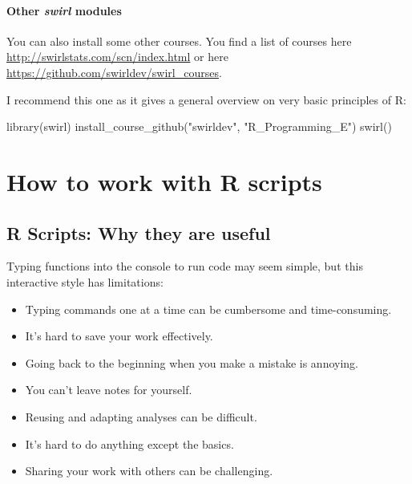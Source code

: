 \documentclass[
  12pt,
  oneside]{book}
\newenvironment{Shaded}{\begin{snugshade}}{\end{snugshade}}
\newcommand{\FunctionTok}[1]{\textcolor[rgb]{0.00,0.00,0.00}{#1}}
\newcommand{\NormalTok}[1]{#1}
\newcommand{\StringTok}[1]{\textcolor[rgb]{0.31,0.60,0.02}{#1}}
\providecommand{\tightlist}{%
  \setlength{\itemsep}{0pt}\setlength{\parskip}{0pt}}
\begin{document}
\hypertarget{other-swirl-modules}{%
\subsubsection*{\texorpdfstring{Other \emph{swirl} modules}{Other swirl modules}}\label{other-swirl-modules}}

You can also install some other courses. You find a list of courses here \url{http://swirlstats.com/scn/index.html} or here \url{https://github.com/swirldev/swirl_courses}.

I recommend this one as it gives a general overview on very basic principles of R:

\begin{Shaded}
\begin{Highlighting}[]
\FunctionTok{library}\NormalTok{(swirl)}
\FunctionTok{install\_course\_github}\NormalTok{(}\StringTok{"swirldev"}\NormalTok{, }\StringTok{"R\_Programming\_E"}\NormalTok{)}
\FunctionTok{swirl}\NormalTok{()}
\end{Highlighting}
\end{Shaded}

\hypertarget{how-to-work-with-r-scripts}{%
\chapter{How to work with R scripts}\label{how-to-work-with-r-scripts}}

\hypertarget{r-scripts-why-they-are-useful}{%
\section{R Scripts: Why they are useful}\label{r-scripts-why-they-are-useful}}

Typing functions into the console to run code may seem simple, but this interactive style has limitations:

\begin{itemize}
\tightlist
\item
  Typing commands one at a time can be cumbersome and time-consuming.
\item
  It's hard to save your work effectively.
\item
  Going back to the beginning when you make a mistake is annoying.
\item
  You can't leave notes for yourself.
\item
  Reusing and adapting analyses can be difficult.
\item
  It's hard to do anything except the basics.
\item
  Sharing your work with others can be challenging.
\end{itemize}
\end{document}
